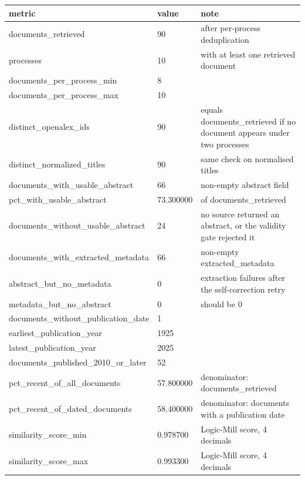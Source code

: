 \begin{tabular}{lll}
\toprule
metric & value & note \\
\midrule
documents\_retrieved & 90 & after per-process deduplication \\
processes & 10 & with at least one retrieved document \\
documents\_per\_process\_min & 8 &  \\
documents\_per\_process\_max & 10 &  \\
distinct\_openalex\_ids & 90 & equals documents\_retrieved if no document appears under two processes \\
distinct\_normalized\_titles & 90 & same check on normalised titles \\
documents\_with\_usable\_abstract & 66 & non-empty abstract field \\
pct\_with\_usable\_abstract & 73.300000 & of documents\_retrieved \\
documents\_without\_usable\_abstract & 24 & no source returned an abstract, or the validity gate rejected it \\
documents\_with\_extracted\_metadata & 66 & non-empty extracted\_metadata \\
abstract\_but\_no\_metadata & 0 & extraction failures after the self-correction retry \\
metadata\_but\_no\_abstract & 0 & should be 0 \\
documents\_without\_publication\_date & 1 &  \\
earliest\_publication\_year & 1925 &  \\
latest\_publication\_year & 2025 &  \\
documents\_published\_2010\_or\_later & 52 &  \\
pct\_recent\_of\_all\_documents & 57.800000 & denominator: documents\_retrieved \\
pct\_recent\_of\_dated\_documents & 58.400000 & denominator: documents with a publication date \\
similarity\_score\_min & 0.978700 & Logic-Mill score, 4 decimals \\
similarity\_score\_max & 0.993300 & Logic-Mill score, 4 decimals \\
\bottomrule
\end{tabular}
